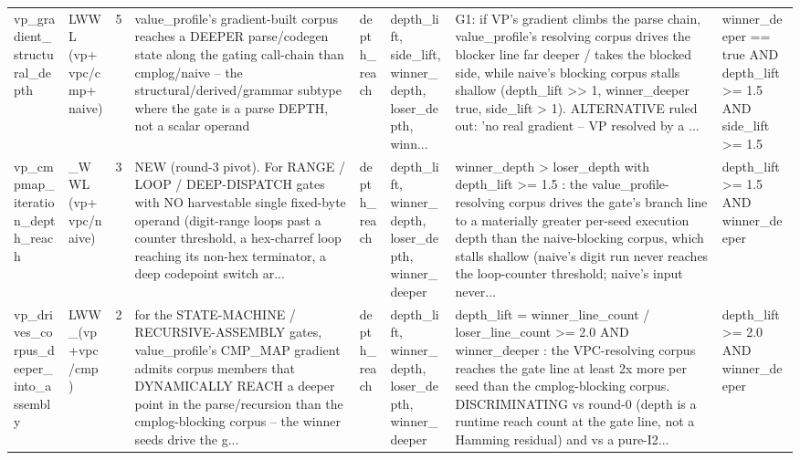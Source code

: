 \documentclass[7pt]{extarticle}
\begin{document}
{\begin{longtable}{@{}p{2.4cm}p{1.9cm}rp{4.3cm}p{1.5cm}p{1.7cm}p{4.6cm}p{3.0cm}@{}}
vp\_\allowbreak gradient\_\allowbreak structural\_\allowbreak depth & LWWL (vp+vpc/cmp+naive) & 5 & value\_\allowbreak profile's gradient-built corpus reaches a DEEPER parse/codegen state along the gating call-chain than cmplog/naive -- the structural/derived/grammar subtype where the gate is a parse DEPTH, not a scalar operand & depth\_\allowbreak reach & depth\_\allowbreak lift, side\_\allowbreak lift, winner\_\allowbreak depth, loser\_\allowbreak depth, winn... & G1: if VP's gradient climbs the parse chain, value\_\allowbreak profile's resolving corpus drives the blocker line far deeper / takes the blocked side, while naive's blocking corpus stalls shallow (depth\_\allowbreak lift \textgreater{}\textgreater{} 1, winner\_\allowbreak deeper true, side\_\allowbreak lift \textgreater{} 1). ALTERNATIVE ruled out: 'no real gradient -- VP resolved by a ... & winner\_\allowbreak deeper == true AND depth\_\allowbreak lift \textgreater{}= 1.5 AND side\_\allowbreak lift \textgreater{}= 1.5\\
vp\_\allowbreak cmpmap\_\allowbreak iteration\_\allowbreak depth\_\allowbreak reach & \_\allowbreak WWL (vp+vpc/naive) & 3 & NEW (round-3 pivot). For RANGE / LOOP / DEEP-DISPATCH gates with NO harvestable single fixed-byte operand (digit-range loops past a counter threshold, a hex-charref loop reaching its non-hex terminator, a deep codepoint switch ar... & depth\_\allowbreak reach & depth\_\allowbreak lift, winner\_\allowbreak depth, loser\_\allowbreak depth, winner\_\allowbreak deeper & winner\_\allowbreak depth \textgreater{} loser\_\allowbreak depth with depth\_\allowbreak lift \textgreater{}= 1.5 : the value\_\allowbreak profile-resolving corpus drives the gate's branch line to a materially greater per-seed execution depth than the naive-blocking corpus, which stalls shallow (naive's digit run never reaches the loop-counter threshold; naive's input never... & depth\_\allowbreak lift \textgreater{}= 1.5 AND winner\_\allowbreak deeper\\
vp\_\allowbreak drives\_\allowbreak corpus\_\allowbreak deeper\_\allowbreak into\_\allowbreak assembly & LWW\_\allowbreak  (vp+vpc/cmp) & 2 & for the STATE-MACHINE / RECURSIVE-ASSEMBLY gates, value\_\allowbreak profile's CMP\_\allowbreak MAP gradient admits corpus members that DYNAMICALLY REACH a deeper point in the parse/recursion than the cmplog-blocking corpus -- the winner seeds drive the g... & depth\_\allowbreak reach & depth\_\allowbreak lift, winner\_\allowbreak depth, loser\_\allowbreak depth, winner\_\allowbreak deeper & depth\_\allowbreak lift = winner\_\allowbreak line\_\allowbreak count / loser\_\allowbreak line\_\allowbreak count \textgreater{}= 2.0 AND winner\_\allowbreak deeper : the VPC-resolving corpus reaches the gate line at least 2x more per seed than the cmplog-blocking corpus. DISCRIMINATING vs round-0 (depth is a runtime reach count at the gate line, not a Hamming residual) and vs a pure-I2... & depth\_\allowbreak lift \textgreater{}= 2.0 AND winner\_\allowbreak deeper\\

\end{longtable}}
\end{document}
